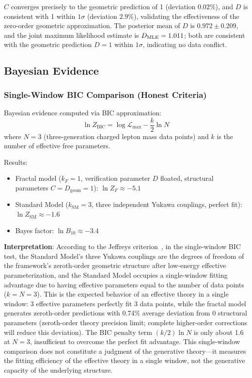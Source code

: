 \documentclass[12pt,a4paper,twocolumn]{article}
\begin{document}
$C$ converges precisely to the geometric prediction of 1 (deviation $0.02\%$), and $D$ is consistent with 1 within $1\sigma$ (deviation $2.9\%$), validating the effectiveness of the zero-order geometric approximation. The posterior mean of $D$ is $0.972\pm0.209$, and the joint maximum likelihood estimate is $D_{\rm MLE}=1.011$; both are consistent with the geometric prediction $D=1$ within $1\sigma$, indicating no data conflict.

\subsection{Bayesian Evidence}
\subsubsection{Single-Window BIC Comparison (Honest Criteria)}
Bayesian evidence computed via BIC approximation:
\[
\ln Z_{\text{BIC}} = \log\mathcal{L}_{\max} - \frac{k}{2}\ln N
\]
where $N=3$ (three-generation charged lepton mass data points) and $k$ is the number of effective free parameters.

Results:
\begin{itemize}
\item Fractal model ($k_F=1$, verification parameter $D$ floated, structural parameters $C=D_{\text{geom}}=1$): $\ln Z_F \approx -5.1$
\item Standard Model ($k_{\text{SM}}=3$, three independent Yukawa couplings, perfect fit): $\ln Z_{\text{SM}} \approx -1.6$
\item Bayes factor: $\ln B_{10} \approx -3.4$
\end{itemize}

\textbf{Interpretation}: According to the Jeffreys criterion~\cite{Jeffreys1961}, in the single-window BIC test, the Standard Model's three Yukawa couplings are the degrees of freedom of the framework's zeroth-order geometric structure after low-energy effective parameterization, and the Standard Model occupies a single-window fitting advantage due to having effective parameters equal to the number of data points ($k=N=3$). This is the expected behavior of an effective theory in a single window: 3 effective parameters perfectly fit 3 data points, while the fractal model generates zeroth-order predictions with 0.74\% average deviation from 0 structural parameters (zeroth-order theory precision limit; complete higher-order corrections will reduce this deviation). The BIC penalty term $(k/2)\ln N$ is only about 1.6 at $N=3$, insufficient to overcome the perfect fit advantage. This single-window comparison does not constitute a judgment of the generative theory---it measures the fitting efficiency of the effective theory in a single window, not the generative capacity of the underlying structure.
\end{document}
